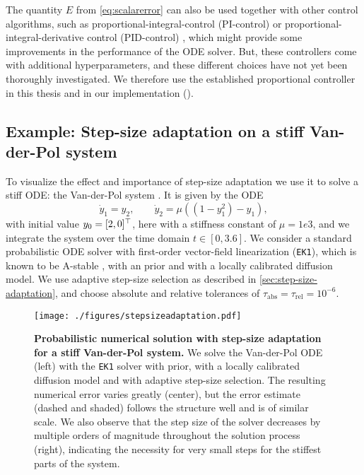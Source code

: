 \documentclass{mimosis}
\begin{document}
\begin{remark}
The quantity \(E\) from \cref{eq:scalarerror} can also be used together with other control algorithms, such as proportional-integral-control (PI-control) \parencite{Gustafsson1988} or proportional-integral-derivative control (PID-control) \parencite{willis1999pid}, which might provide some improvements in the performance of the ODE solver.
But, these controllers come with additional hyperparameters, and these different choices have not yet been thoroughly investigated.
We therefore use the established proportional controller in this thesis and in our implementation
(\joss{}).
\end{remark}
\subsection{Example: Step-size adaptation on a stiff Van-der-Pol system}
\label{sec:orgd013551}
To visualize the effect and importance of step-size adaptation we use it to solve a stiff ODE: the Van-der-Pol system
\parencite{vanderpol}.
It is given by the ODE
\begin{equation}
  \dot{y}_1 = y_2, \qquad
  \dot{y}_2 = \mu \left( \left( 1 - y_1^2 \right) - y_1 \right),
\end{equation}
with initial value
\(y_0 = [2, 0]^\top\),
here with a stiffness constant of \(\mu=1e3\),
and we integrate the system over the time domain \(t \in [0, 3.6]\).
We consider a standard probabilistic ODE solver with first-order vector-field linearization (\texttt{EK1}), which is known to be A-stable \parencite{tronarp18_probab_solut_to_ordin_differ},
with an  prior and with a locally calibrated diffusion model.
We use adaptive step-size selection as described in \cref{sec:step-size-adaptation}, and choose absolute and relative tolerances of \(\tau_\text{abs} = \tau_\text{rel}=10^{-6}\).

\begin{figure}[t]
\centering
\texttt{[image: ./figures/stepsizeadaptation.pdf]}
\caption{\label{fig:stepsizeadaptation}\textbf{Probabilistic numerical solution with step-size adaptation for a stiff Van-der-Pol system.} We solve the Van-der-Pol ODE (left) with the \texttt{EK1} solver with  prior, with a locally calibrated diffusion model and with adaptive step-size selection. The resulting numerical error varies greatly (center), but the error estimate (dashed and shaded) follows the structure well and is of similar scale. We also observe that the step size of the solver decreases by multiple orders of magnitude throughout the solution process (right), indicating the necessity for very small steps for the stiffest parts of the system.}
\end{figure}
\end{document}
